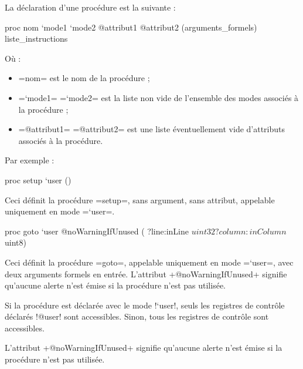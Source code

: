 La déclaration d'une procédure est la suivante :
\begin{PLM}
proc nom `mode1 `mode2 @attribut1 @attribut2 (arguments_formels) {
  liste_instructions
}
\end{PLM}
Où :
\begin{itemize}
  \item \plm=nom= est le nom de la procédure ;
  \item \plm=`mode1= \plm=`mode2= est la liste non vide de l'ensemble des modes associés à la procédure ;
  \item \plm=@attribut1= \plm=@attribut2= est une liste éventuellement vide d'attributs associés à la procédure.
\end{itemize}

Par exemple :

\begin{PLM}
proc setup `user () {
}
\end{PLM}

Ceci définit la procédure \plm=setup=, sans argument, sans attribut, appelable uniquement en mode \plm=`user=.

\begin{PLM}
proc goto `user @noWarningIfUnused (
  ?line:inLine $uint32
  ?column:inColumn $uint8) {
}
\end{PLM}

Ceci définit la procédure \plm=goto=, appelable uniquement en mode \plm=`user=, avec deux arguments formels en entrée. L'attribut \plm+@noWarningIfUnused+ signifie qu'aucune alerte n'est émise si la procédure n'est pas utilisée.





Si la procédure est déclarée avec le mode \plm!`user!, seuls les registres de contrôle déclarés \plm!@user! sont accessibles. Sinon, tous les registres de contrôle sont accessibles.








L'attribut \plm+@noWarningIfUnused+ signifie qu'aucune alerte n'est émise si la procédure n'est pas utilisée.




